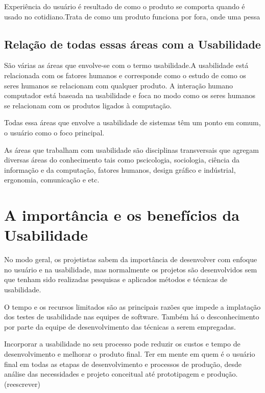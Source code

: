	Experiência do usuário é resultado de como o produto se comporta quando é usado no cotidiano.Trata de como um produto funciona por fora, onde uma pessa 	


\subsection{Relação de todas essas áreas com a Usabilidade}

	São várias as áreas que envolve-se com o termo usabilidade.A usabilidade está relacionada com os fatores humanos e corresponde como o estudo de como os seres humanos se relacionam com qualquer produto. A interação humano computador está baseada na usabilidade e foca no modo como os seres humanos se relacionam com os produtos ligados à computação.

	Todas essa áreas que envolve a usabilidade de sistemas têm um ponto em comum, o usuário como o foco principal.

	As áreas que trabalham com usabilidade são disciplinas transversais que agregam diversas áreas do conhecimento tais como pscicologia, sociologia, ciência da informação e da computação, fatores humanos, design gráfico e indústrial, ergonomia, comunicação e etc.

	 

\section{A importância e os benefícios da Usabilidade}

No modo geral, os projetistas sabem da importância de desenvolver com enfoque no usuário e na usabilidade, mas normalmente os projetos são desenvolvidos sem que tenham sido realizadas pesquisas e aplicados métodos e técnicas de usabilidade.
	
	O tempo e os recursos limitados são as principais razões que impede a implatação dos testes de usabilidade nas equipes de software. Também há o desconhecimento por parte da equipe de desenvolvimento das técnicas a serem empregadas.

Incorporar a usabilidade no seu processo pode reduzir os custos e tempo de desenvolvimento e melhorar o produto final. Ter em mente  em quem é o usuário final em todas as etapas de desenvolvimento e processos de produção, desde análise das necessidades e projeto conceitual até prototipagem e produção.  (reescrever)

